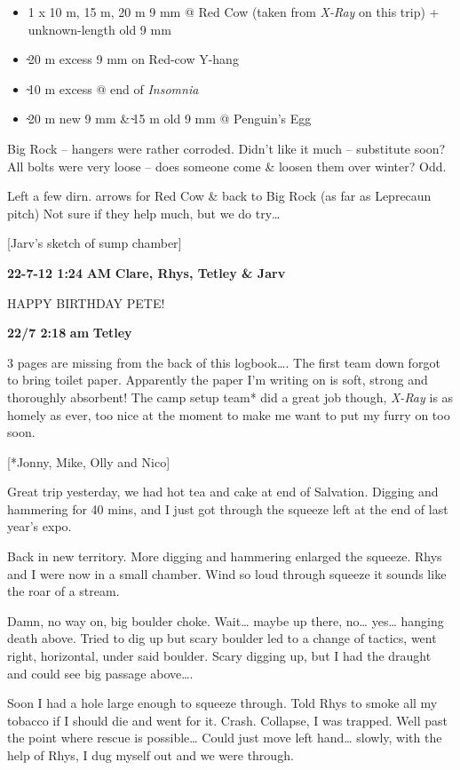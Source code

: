 \begin{itemize}
\tightlist
\item
  1 x 10 m, 15 m, 20 m 9 mm @ Red Cow (taken from \emph{X-Ray} on this
  trip) + unknown-length old 9 mm
\item
  ̴20 m excess 9 mm on Red-cow Y-hang
\item
  ̴10 m excess @ end of \emph{Insomnia}
\item
  ̴20 m new 9 mm \& ̴15 m old 9 mm @ Penguin's Egg
\end{itemize}

Big Rock -- hangers were rather corroded. Didn't like it much --
substitute soon? All bolts were very loose -- does someone come \&
loosen them over winter? Odd.

Left a few dirn. arrows for Red Cow \& back to Big Rock (as far as
Leprecaun pitch) Not sure if they help much, but we do try\ldots{}

{[}Jarv's sketch of sump chamber{]}

\textbf{22-7-12 1:24} \textbf{AM} \textbf{Clare, Rhys, Tetley \& Jarv}

HAPPY BIRTHDAY PETE!

\textbf{22/7 2:18} \textbf{am} \textbf{Tetley}

3 pages are missing from the back of this logbook\ldots{}. The first
team down forgot to bring toilet paper. Apparently the paper I'm writing
on is soft, strong and thoroughly absorbent! The camp setup team* did a
great job though, \emph{X-Ray} is as homely as ever, too nice at the
moment to make me want to put my furry on too soon.

{[}*Jonny, Mike, Olly and Nico{]}

Great trip yesterday, we had hot tea and cake at end of Salvation.
Digging and hammering for 40 mins, and I just got through the squeeze
left at the end of last year's expo.

Back in new territory. More digging and hammering enlarged the squeeze.
Rhys and I were now in a small chamber. Wind so loud through squeeze it
sounds like the roar of a stream.

Damn, no way on, big boulder choke. Wait\ldots{} maybe up there,
no\ldots{} yes\ldots{} hanging death above. Tried to dig up but scary
boulder led to a change of tactics, went right, horizontal, under said
boulder. Scary digging up, but I had the draught and could see big
passage above\ldots{}.

Soon I had a hole large enough to squeeze through. Told Rhys to smoke
all my tobacco if I should die and went for it. Crash. Collapse, I was
trapped. Well past the point where rescue is possible\ldots{} Could just
move left hand\ldots{} slowly, with the help of Rhys, I dug myself out
and we were through.

